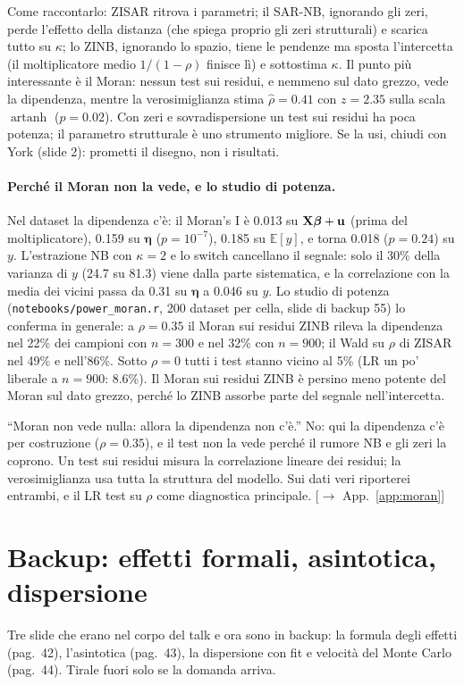 \documentclass[11pt,a4paper]{article}
\newcommand{\app}[1]{{\small\color{navy}[$\to$ App.~\ref{#1}]}}
\newcommand{\E}{\mathbb{E}}
\newcommand{\bu}{\mathbf{u}}\newcommand{\bI}{\mathbf{I}}\newcommand{\bS}{\mathbf{S}}\newcommand{\bH}{\mathbf{H}}
\newcommand{\beeta}{\boldsymbol{\eta}}\newcommand{\bbeta}{\boldsymbol{\beta}}\newcommand{\bgamma}{\boldsymbol{\gamma}}
\begin{document}
Come raccontarlo: ZISAR ritrova i parametri; il SAR-NB, ignorando gli zeri, perde l'effetto della distanza (che spiega proprio gli zeri strutturali) e scarica tutto su $\kappa$; lo ZINB, ignorando lo spazio, tiene le pendenze ma sposta l'intercetta (il moltiplicatore medio $1/(1-\rho)$ finisce lì) e sottostima $\kappa$. Il punto più interessante è il Moran: nessun test sui residui, e nemmeno sul dato grezzo, vede la dipendenza, mentre la verosimiglianza stima $\hat\rho=0.41$ con $z=2.35$ sulla scala $\operatorname{artanh}$ ($p=0.02$). Con zeri e sovradispersione un test sui residui ha poca potenza; il parametro strutturale è uno strumento migliore. Se la usi, chiudi con York (slide 2): prometti il disegno, non i risultati.
\paragraph{Perché il Moran non la vede, e lo studio di potenza.} Nel dataset la dipendenza c'è: il Moran's I è 0.013 su $\bX\bbeta+\bu$ (prima del moltiplicatore), 0.159 su $\beeta$ ($p=10^{-7}$), 0.185 su $\E[y]$, e torna 0.018 ($p=0.24$) su $y$. L'estrazione NB con $\kappa=2$ e lo switch cancellano il segnale: solo il 30\% della varianza di $y$ (24.7 su 81.3) viene dalla parte sistematica, e la correlazione con la media dei vicini passa da 0.31 su $\beeta$ a 0.046 su $y$. Lo studio di potenza (\texttt{notebooks/power\_moran.r}, 200 dataset per cella, slide di backup 55) lo conferma in generale: a $\rho=0.35$ il Moran sui residui ZINB rileva la dipendenza nel 22\% dei campioni con $n=300$ e nel 32\% con $n=900$; il Wald su $\rho$ di ZISAR nel 49\% e nell'86\%. Sotto $\rho=0$ tutti i test stanno vicino al 5\% (LR un po' liberale a $n=900$: 8.6\%). Il Moran sui residui ZINB è persino meno potente del Moran sul dato grezzo, perché lo ZINB assorbe parte del segnale nell'intercetta.
\begin{warn}
``Moran non vede nulla: allora la dipendenza non c'è.'' No: qui la dipendenza c'è per costruzione ($\rho=0.35$), e il test non la vede perché il rumore NB e gli zeri la coprono. Un test sui residui misura la correlazione lineare dei residui; la verosimiglianza usa tutta la struttura del modello. Sui dati veri riporterei entrambi, e il LR test su $\rho$ come diagnostica principale. \app{app:moran}
\end{warn}

\section{Backup: effetti formali, asintotica, dispersione}
Tre slide che erano nel corpo del talk e ora sono in backup: la formula degli effetti (pag.~42), l'asintotica (pag.~43), la dispersione con fit e velocità del Monte Carlo (pag.~44). Tirale fuori solo se la domanda arriva.
\end{document}
